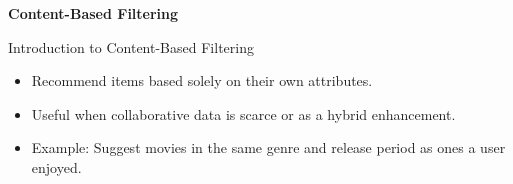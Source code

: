 \documentclass{beamer}
\begin{document}


\begin{frame}[plain]
    \begin{center}
        {\LARGE \textbf{Content-Based Filtering}}
    \end{center}
\end{frame}

\begin{frame}{Introduction to Content-Based Filtering}
\begin{itemize}
  \item Recommend items based solely on their own attributes.
  \item Useful when collaborative data is scarce or as a hybrid enhancement.
  \item Example: Suggest movies in the same genre and release period as ones a user enjoyed.
\end{itemize}
\end{frame}
\end{document}
